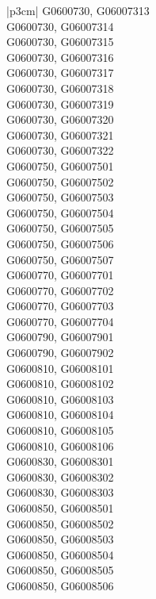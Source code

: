 \begin{customLongTable}{ |p{3cm}| }
G0600730, G06007313 \\ \hline
G0600730, G06007314 \\ \hline
G0600730, G06007315 \\ \hline
G0600730, G06007316 \\ \hline
G0600730, G06007317 \\ \hline
G0600730, G06007318 \\ \hline
G0600730, G06007319 \\ \hline
G0600730, G06007320 \\ \hline
G0600730, G06007321 \\ \hline
G0600730, G06007322 \\ \hline
G0600750, G06007501 \\ \hline
G0600750, G06007502 \\ \hline
G0600750, G06007503 \\ \hline
G0600750, G06007504 \\ \hline
G0600750, G06007505 \\ \hline
G0600750, G06007506 \\ \hline
G0600750, G06007507 \\ \hline
G0600770, G06007701 \\ \hline
G0600770, G06007702 \\ \hline
G0600770, G06007703 \\ \hline
G0600770, G06007704 \\ \hline
G0600790, G06007901 \\ \hline
G0600790, G06007902 \\ \hline
G0600810, G06008101 \\ \hline
G0600810, G06008102 \\ \hline
G0600810, G06008103 \\ \hline
G0600810, G06008104 \\ \hline
G0600810, G06008105 \\ \hline
G0600810, G06008106 \\ \hline
G0600830, G06008301 \\ \hline
G0600830, G06008302 \\ \hline
G0600830, G06008303 \\ \hline
G0600850, G06008501 \\ \hline
G0600850, G06008502 \\ \hline
G0600850, G06008503 \\ \hline
G0600850, G06008504 \\ \hline
G0600850, G06008505 \\ \hline
G0600850, G06008506 \\ \hline

\end{customLongTable}
